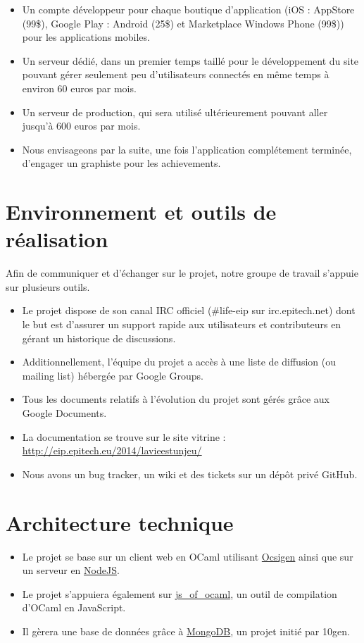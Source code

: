 \documentclass{life-fr}
\begin{document}
\begin{itemize}
  \item Un compte développeur pour chaque boutique d'application (iOS : AppStore (99\$), Google Play : Android (25\$) et Marketplace Windows Phone (99\$)) pour les applications mobiles.
  \item Un serveur dédié, dans un premier temps taillé pour le développement du site pouvant gérer seulement peu d'utilisateurs connectés en même temps à environ 60 euros par mois.
  \item Un serveur de production, qui sera utilisé ultérieurement pouvant aller jusqu'à 600 euros par mois.
  \item Nous envisageons par la suite, une fois l'application complétement terminée, d'engager un graphiste pour les achievements.
\end{itemize}

\section{Environnement et outils de réalisation}

Afin de communiquer et d’échanger sur le projet, notre groupe de travail s’appuie sur plusieurs outils.

\begin{itemize}
  \item Le projet dispose de son canal IRC officiel (\#life-eip sur irc.epitech.net) dont le but est d’assurer un support rapide aux utilisateurs et contributeurs en gérant un historique de discussions.
  \item Additionnellement, l’équipe du projet a accès à une liste de diffusion (ou mailing list) hébergée par Google Groups.
  \item Tous les documents relatifs à l’évolution du projet sont gérés grâce aux Google Documents.
  \item La documentation se trouve sur le site vitrine : \url{http://eip.epitech.eu/2014/lavieestunjeu/}
  \item Nous avons un bug tracker, un wiki et des tickets sur un dépôt privé GitHub.
\end{itemize}

\section{Architecture technique}

\begin{itemize}
	\item Le projet se base sur un client web en OCaml utilisant \href{http://ocsigen.org/}{Ocsigen} ainsi que sur un serveur en \href{http://nodejs.org}{NodeJS}.
  \item Le projet s’appuiera également sur \href{http://ocsigen.org/js\_of\_ocaml/}{js\_of\_ocaml}, un outil de compilation d’OCaml en JavaScript.
  \item Il gèrera une base de données grâce à \href{http://www.mongodb.org}{MongoDB}, un projet initié par 10gen.
\end{itemize}
\end{document}
